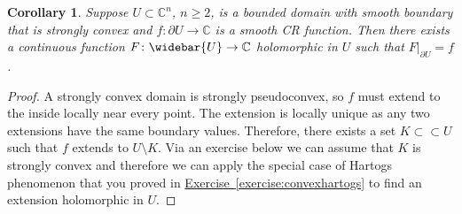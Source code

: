 \documentclass[12pt,openany]{book}
\newcommand{\C}{{\mathbb{C}}}
\theoremstyle{plain}
\newtheorem{cor}[thm]{Corollary}
\theoremstyle{remark}
\theoremstyle{definition}
\theoremstyle{exercise}
\theoremstyle{example}
\newcommand{\exerciseref}[1]{\hyperref[#1]{Exercise~\ref*{#1}}}
\begin{document}
\begin{cor} \label{cor:bochnerhartogsstrconvex}
Suppose $U \subset \C^n$, $n \geq 2$, is a bounded domain with smooth boundary that is
strongly convex
and $f \colon \partial U \to \C$ is a smooth CR function.
Then there exists a continuous function $F \colon \widebar{U} \to \C$
holomorphic in $U$
such that $F|_{\partial U} = f$.
\end{cor}

\begin{proof}
A strongly convex domain is strongly pseudoconvex, so $f$ must extend to the
inside locally near every point.  The extension is locally unique as any two
extensions have the same boundary values.  Therefore, there exists a set
$K \subset \subset U$ such that $f$ extends to $U \setminus K$.
Via an exercise below we can assume that $K$ is strongly convex and
therefore we can apply the special case of Hartogs phenomenon
that you proved in \exerciseref{exercise:convexhartogs} to find an
extension holomorphic in $U$.
\end{proof}
\end{document}
